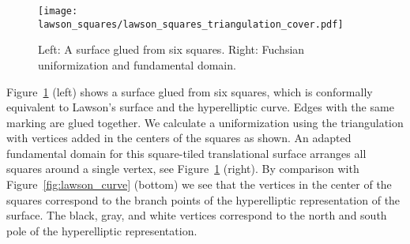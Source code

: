 \documentclass[Thesis]{subfiles}
\begin{document}
\begin{figure}
	\centering
	\resizebox{\textwidth}{!} {
	\texttt{[image: lawson\_squares/lawson\_squares\_triangulation\_cover.pdf]}
	}
	\caption{Left: A surface glued from six squares. Right:
          Fuchsian uniformization and fundamental domain.}
\label{fig:lawson_squares}
\end{figure}

Figure~\ref{fig:lawson_squares} (left) shows a surface glued from six
squares, which is conformally equivalent to Lawson's surface and the
hyperelliptic curve. Edges with the same marking are glued
together. We calculate a uniformization using the triangulation with
vertices added in the centers of the squares as shown. An adapted
fundamental domain for this square-tiled translational surface
arranges all squares around a single vertex, see
Figure~\ref{fig:lawson_squares} (right). By comparison with
Figure~\ref{fig:lawson_curve} (bottom) we see that the vertices in the
center of the squares correspond to the branch points of the
hyperelliptic representation of the surface. The black, gray, and
white vertices correspond to the north and south pole of the
hyperelliptic representation.

\subfilebibliography
\end{document}
